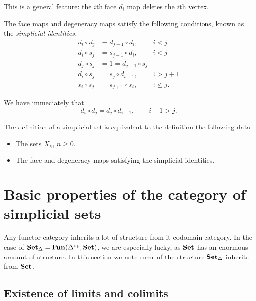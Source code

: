 \documentclass[main.tex]{subfiles}
\begin{document}
This is a general feature: the $i$th face $d_{i}$ map deletes the $i$th vertex.

\begin{theorem}
  \label{thm:simplicial_identities}
  The face maps and degeneracy maps satisfy the following conditions, known as the \emph{simplicial identities.}
  \begin{align*}
    d_{i} \circ d_{j} &= d_{j - 1} \circ d_{i},&i < j \\
    d_{i} \circ s_{j} &= s_{j-1} \circ d_{i}, &i < j \\
    d_{j} \circ s_{j} &= 1 = d_{j+1} \circ s_{j} \\
    d_{i} \circ s_{j} &= s_{j} \circ d_{i-1}, &i > j + 1 \\
    s_{i} \circ s_{j} &= s_{j+1} \circ s_{i}, &i \leq j.
  \end{align*}
\end{theorem}

\begin{corollary}
  We have immediately that
  \begin{equation*}
    d_{i} \circ d_{j} = d_{j} \circ d_{i+1},\qquad i+1 > j.
  \end{equation*}
\end{corollary}

\begin{fact}
  The definition of a simplicial set is equivalent to the definition the following data.
  \begin{itemize}
    \item The sets $X_{n}$, $n \geq 0$.
    \item The face and degeneracy maps satisfying the simplicial identities.
  \end{itemize}
\end{fact}

\section{Basic properties of the category of simplicial sets}
\label{sec:basic_properties_of_the_category_of_simplicial_sets}

Any functor category inherits a lot of structure from it codomain category. In the case of $\operatorname{\mathbf{Set}_{\Delta}} = \operatorname{\mathbf{Fun}}(\Delta^{\mathrm{op}}, \mathbf{Set})$, we are especially lucky, as $\mathbf{Set}$ has an enormous amount of structure. In this section we note some of the structure $\operatorname{\mathbf{Set}_{\Delta}}$ inherits from $\mathbf{Set}$.

\subsection{Existence of limits and colimits}
\label{ssc:existence_of_limits_and_colimits}
\end{document}
